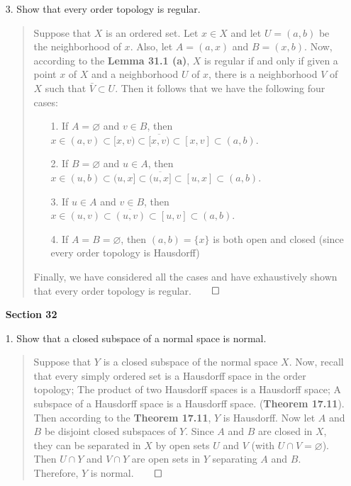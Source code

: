\documentclass[12pt, a4paper]{article}
\renewcommand{\emptyset}{\varnothing}  %
\begin{document}
\begin{itemize}
\newpage

\item[3.]
Show that every order topology is regular.
\begin{quote}
Suppose that $X$ is an ordered set. Let $x \in X$ and let $U = (a, b)$
be the neighborhood of $x$. Also, let $A = (a, x)$ and $B = (x, b)$.
Now, according to the \textbf{Lemma 31.1 (a)}, $X$ is regular if and only if given a point $x$ of $X$ and a neighborhood
$U$ of $x$, there is a neighborhood $V$ of $X$ such that $\bar{V} \subset U$.
Then it follows that we have the following four cases:
\begin{itemize}
\item[1.]
If $A = \emptyset$ and $v \in B$, then $x \in (a, v) \subset [x, v) \subset \overline{[x, v)} \subset [x, v] \subset (a, b)$.
\item[2.]
If $B = \emptyset$ and $u \in A$, then $x \in (u, b) \subset (u, x] \subset \overline{(u, x]} \subset [u, x] \subset (a, b)$.
\item[3.]
If $u \in A$ and $v \in B$, then $x \in (u, v) \subset \overline{(u, v)} \subset [u, v] \subset (a, b)$.
\item[4.]
If $A = B = \emptyset$, then $(a, b) = \{x\}$ is both open and closed (since every order topology is Hausdorff)
\end{itemize}
Finally, we have considered all the cases and have exhaustively shown that every order topology is regular.$\qed$
\end{quote}


\item[]
\item[]
\item[]
{\large \textbf{Section 32}}
\vspace{0.3cm}

\item[1.]
Show that a closed subspace of a normal space is normal.
\begin{quote}
Suppose that $Y$ is a closed subspace of the normal space $X$.
Now, recall that every simply ordered set is a Hausdorff space in the
order topology; The product of two Hausdorff spaces is a Hausdorff space;
A subspace of a Hausdorff space is a Hausdorff space. (\textbf{Theorem 17.11}).
Then according to the \textbf{Theorem 17.11}, $Y$ is Hausdorff.
Now let $A$ and $B$ be disjoint closed subspaces of $Y$. Since $A$ and $B$ are
closed in $X$, they can be separated in $X$ by open sets $U$ and $V$ (with $U \cap V = \emptyset$).
Then $U \cap Y$ and $V \cap Y$ are open sets in $Y$ separating $A$ and $B$.
Therefore, $Y$ is normal.$\qed$
\end{quote}

\end{itemize}
\end{document}
